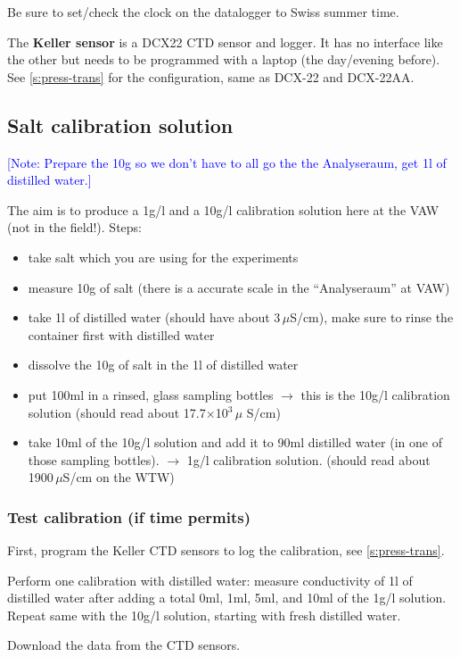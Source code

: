 \documentclass[DIV=15,halfparskip,11pt,headinclude]{scrartcl}
\newcommand{\note}[1]{\textcolor{blue}{[Note: #1]}}
\newcommand{\note}[1]{}
\begin{document}
Be sure to set/check the clock on the datalogger to Swiss summer time.

The \textbf{Keller sensor} is a DCX22 CTD sensor and logger.  It has
no interface like the other but needs to be programmed with a laptop
(the day/evening before).  See \ref{s:press-trans} for the
configuration, same as DCX-22 and DCX-22AA.

\subsection{Salt calibration solution}
\note{Prepare the 10g so we don't have to all go the the Analyseraum,
  get 1l of distilled water.}

The aim is to produce a 1g/l and a 10g/l calibration solution here at the VAW
(not in the field!).  Steps:
\begin{itemize}
\item take salt which you are using for the experiments
\item measure 10g of salt (there is a accurate scale in the
  ``Analyseraum'' at VAW)
\item take 1l of distilled water (should have about 3\,$\mu$S/cm),
  make sure to rinse the container first with distilled water
\item dissolve the 10g of salt in the 1l of distilled water
\item put 100ml in a rinsed, glass sampling bottles $\rightarrow$ this
  is the 10g/l calibration solution (should read about 17.7$\times$10$^3\,\mu$
  S/cm)
\item take 10ml of the 10g/l solution and add it to 90ml distilled
  water (in one of those sampling bottles).  $\rightarrow$ 1g/l
  calibration solution. (should read about 1900\,$\mu$S/cm on the WTW)
\end{itemize}

\subsubsection{Test calibration (if time permits)}

First, program the Keller CTD sensors to log the calibration, see
\ref{s:press-trans}.

Perform one calibration with distilled water: measure conductivity of
1l of distilled water after adding a total 0ml, 1ml, 5ml, and 10ml of
the 1g/l solution.  Repeat same with the 10g/l solution, starting with
fresh distilled water.

Download the data from the CTD sensors.
\end{document}
